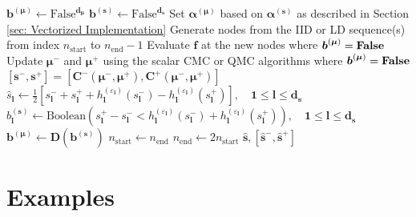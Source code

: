 \documentclass[graybox]{svmult}
\begin{document}
\begin{algorithm}[t]
\begin{algorithmic}
    \State $\boldsymbol{b}^{(\boldsymbol{\mu})} \gets \text{False}^{\boldsymbol{d}_{\boldsymbol{\mu}}}$ 
    \State $\boldsymbol{b}^{(\boldsymbol{s})} \gets \text{False}^{\boldsymbol{d}_{\boldsymbol{s}}}$ 
    \State Set $\boldsymbol{\alpha}^{(\boldsymbol{\mu})}$ based on $\boldsymbol{\alpha}^{(\boldsymbol{s})}$ as described in Section \ref{sec: Vectorized Implementation}
     
        \State Generate nodes from the IID or LD sequence(s) from index $n_\text{start}$ to $n_\text{end}-1$
        \State Evaluate $\boldsymbol{f}$ at the new nodes where $\boldsymbol{b}^{(\boldsymbol{\mu})}=\textbf{\text{False}}$ 
        \State Update $\boldsymbol{\mu}^-$ and $\boldsymbol{\mu}^+$ using the scalar CMC or QMC algorithms where $\boldsymbol{b}^{(\boldsymbol{\mu})}=\textbf{\text{False}}$
        \State $[\boldsymbol{s}^-,\boldsymbol{s}^+] = \left[\boldsymbol{C}^-(\boldsymbol{\mu}^-,\boldsymbol{\mu}^+),\boldsymbol{C}^+(\boldsymbol{\mu}^-,\boldsymbol{\mu}^+)\right]$ 
        \State $\hat{s}_{\boldsymbol{l}} \gets \frac{1}{2}\left[s_{\boldsymbol{l}}^-+s_{\boldsymbol{l}}^++h^{(\varepsilon_{\boldsymbol{l}})}_{\boldsymbol{l}}(s_{\boldsymbol{l}}^-)-h^{(\varepsilon_{\boldsymbol{l}})}_{\boldsymbol{l}}(s_{\boldsymbol{l}}^+)\right], \quad\boldsymbol{1} \leq \boldsymbol{l} \leq \boldsymbol{d}_{\boldsymbol{s}}$ 
        \State $b^{(\boldsymbol{s})}_{\boldsymbol{l}} \gets \text{Boolean}\left(s_{\boldsymbol{l}}^+-s_{\boldsymbol{l}}^- < h^{(\varepsilon_{\boldsymbol{l}})}_{\boldsymbol{l}}(s_{\boldsymbol{l}}^-)+h^{(\varepsilon_{\boldsymbol{l}})}_{\boldsymbol{l}}(s_{\boldsymbol{l}}^+)\right),\quad \boldsymbol{1} \leq \boldsymbol{l} \leq \boldsymbol{d}_{\boldsymbol{s}}$ 
        \State $\boldsymbol{b}^{(\boldsymbol{\mu})} \gets \boldsymbol{D}\left(\boldsymbol{b}^{(\boldsymbol{s})}\right)$
        \State $n_\text{start} \gets n_\text{end}$
        \State $n_\text{end} \gets 2n_\text{start}$
    \EndWhile
    \State \Return $\hat{\boldsymbol{s}},[\hat{\boldsymbol{s}}^-,\hat{\boldsymbol{s}}^+]$
    \end{algorithmic}
\end{algorithm}

\section{Examples} \label{sec:examples}
\end{document}

